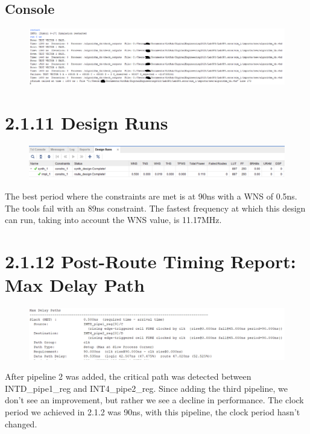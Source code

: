 \documentclass[11pt]{report}
\begin{document}
\subsection*{Console}
\begin{figure}[H]
    \includegraphics[width=\columnwidth]{Reports/Lab3/Assets/2.1.10_console.png}
\end{figure}

\section*{2.1.11 Design Runs}
\begin{figure}[H]
    \includegraphics[width=\columnwidth]{Reports/Lab3/Assets/2.1.11_design-runs.png}
\end{figure}
The best period where the constraints are met is at 90ns with a WNS of 0.5ns. The tools fail with an 89ns constraint. The fastest frequency at which this design can run, taking into account the WNS value, is 11.17MHz.

\section*{2.1.12 Post-Route Timing Report: Max Delay Path}
\begin{figure}[H]
    \includegraphics[width=\columnwidth]{Reports/Lab3/Assets/2.1.12_max-path-delays.png}
\end{figure}
After pipeline 2 was added, the critical path was detected between INTD\_pipe1\_reg and INT4\_pipe2\_reg. Since adding the third pipeline, we don't see an improvement, but rather we see a decline in performance. The clock period we achieved in 2.1.2 was 90ns, with this pipeline, the clock period hasn't changed.
\end{document}
